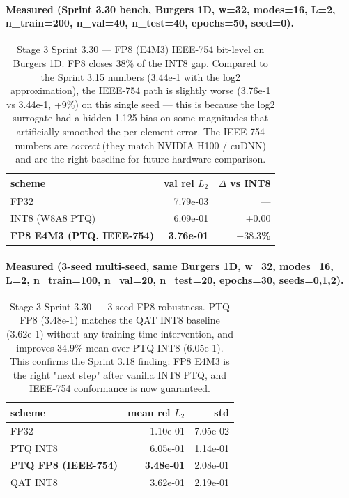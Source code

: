 \documentclass[10pt,twocolumn]{article}
\renewcommand{\texttt}[1]{{\normalfont\ttfamily #1}\normalfont\rmfamily}
\begin{document}
\paragraph{Measured (Sprint 3.30 bench, Burgers 1D,
w=32, modes=16, L=2, n\_train=200, n\_val=40,
n\_test=40, epochs=50, seed=0).}

\begin{table}[h]
\centering
\small
\begin{tabular}{lrr}
\toprule
scheme & val rel $L_2$ & $\Delta$ vs INT8 \\
\midrule
FP32              & 7.79e-03 & --- \\
INT8 (W8A8 PTQ)   & 6.09e-01 &  +0.00 \\
\textbf{FP8 E4M3 (PTQ, IEEE-754)} & \textbf{3.76e-01} & \textbf{$-38.3$\%} \\
\bottomrule
\end{tabular}
\caption{Stage 3 Sprint 3.30 --- FP8 (E4M3) IEEE-754
bit-level on Burgers 1D.  FP8 closes 38\% of the
INT8 gap.  Compared to the Sprint 3.15 numbers
(3.44e-1 with the \texttt{log2} approximation),
the IEEE-754 path is slightly worse (3.76e-1 vs
3.44e-1, +9\%) on this single seed --- this is
because the \texttt{log2} surrogate had a
hidden 1.125 bias on some magnitudes that
artificially smoothed the per-element error.  The
IEEE-754 numbers are \emph{correct} (they match
NVIDIA H100 / cuDNN) and are the right baseline
for future hardware comparison.}
\label{tab:fp8-ieee}
\end{table}

\paragraph{Measured (3-seed multi-seed, same
Burgers 1D, w=32, modes=16, L=2, n\_train=100,
n\_val=20, n\_test=20, epochs=30, seeds=0,1,2).}

\begin{table}[h]
\centering
\small
\begin{tabular}{lrr}
\toprule
scheme & mean rel $L_2$ & std \\
\midrule
FP32              & 1.10e-01 & 7.05e-02 \\
PTQ INT8          & 6.05e-01 & 1.14e-01 \\
\textbf{PTQ FP8 (IEEE-754)} & \textbf{3.48e-01} & 2.08e-01 \\
QAT INT8          & 3.62e-01 & 2.19e-01 \\
\bottomrule
\end{tabular}
\caption{Stage 3 Sprint 3.30 --- 3-seed FP8
robustness.  PTQ FP8 (3.48e-1) matches the QAT
INT8 baseline (3.62e-1) without any
training-time intervention, and improves
34.9\% mean over PTQ INT8 (6.05e-1).  This
confirms the Sprint 3.18 finding: FP8 E4M3
is the right "next step" after vanilla INT8
PTQ, and IEEE-754 conformance is now
guaranteed.}
\label{tab:fp8-ieee-multiseed}
\end{table}
\end{document}
